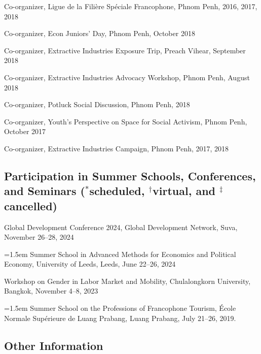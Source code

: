 \documentclass[10pt,a4paper]{article}
\begin{document}
	Co-organizer, Ligue de la Filière Spéciale Francophone, Phnom Penh, 2016, 2017, 2018
		
	Co-organizer, Econ Juniors' Day, Phnom Penh, October 2018
		
	Co-organizer, Extractive Industries Exposure Trip, Preach Vihear, September 2018

	Co-organizer, Extractive Industries Advocacy Workshop, Phnom Penh, August 2018
		
	Co-organizer, Potluck Social Discussion, Phnom Penh, 2018
			
	Co-organizer, Youth's Perspective on Space for Social Activism, Phnom Penh, October 2017
		
	Co-organizer, Extractive Industries Campaign, Phnom Penh, 2017, 2018


\subsection*{Participation in Summer Schools, Conferences, and Seminars ($^\ast$scheduled, $^\dag$virtual, and $^\ddag$cancelled)}

Global Development Conference 2024, Global Development Network, Suva, November 26--28, 2024 

\hangindent=1.5em
Summer School in Advanced Methods for Economics and Political Economy, University of Leeds, Leeds, June 22--26, 2024

Workshop on Gender in Labor Market and Mobility, Chulalongkorn University, Bangkok, November 4--8, 2023

\hangindent=1.5em
Summer School on the Professions of Francophone Tourism, École Normale Supérieure de Luang Prabang, Luang Prabang, July 21–26, 2019.



\subsection*{Other Information}
\end{document}

